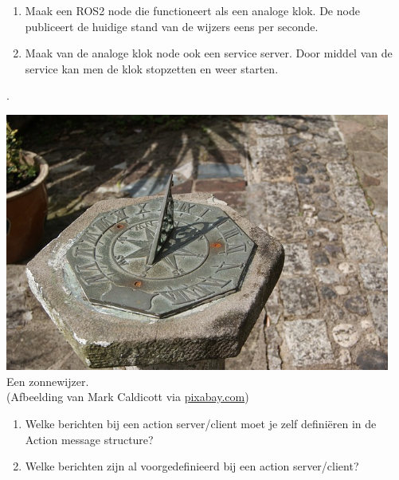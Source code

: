 \begin{exercise}[Wijzerplaat]\mbox{}
\begin{minipage}{0.5\textwidth}
\begin{enumerate}
    \item Maak een ROS2 node die functioneert als een analoge klok. De node publiceert de huidige stand van de wijzers eens per seconde.
    \item Maak van de analoge klok node ook een service server. Door middel van de service kan men de klok stopzetten en weer starten.
\end{enumerate}.
\end{minipage}\hfill 
\begin{minipage}{0.4\textwidth}
\begin{center}
\includegraphics[width=0.95\textwidth]{Pictures/cc_pixabay_zonnwijzer.jpg}\\
Een zonnewijzer.\\
{\tiny(Afbeelding van Mark Caldicott via \url{pixabay.com})}
\end{center}
\end{minipage}
\end{exercise}

\newpage %

\begin{exercise}[Actie]\mbox{}%
\begin{enumerate}
    \item Welke berichten bij een action server/client moet je zelf definiëren in de Action message structure?
    \item Welke berichten zijn al voorgedefinieerd bij een action server/client?
\end{enumerate}
\end{exercise}

